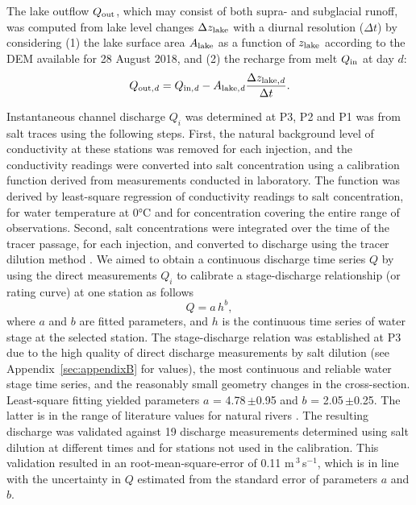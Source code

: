 The lake outflow $Q_{\rm out}$, which may consist of both supra- and subglacial runoff, was computed from lake level changes $\Delta z_{\rm lake }$ with a diurnal resolution ($\Delta t$) by considering (1) the lake surface area $A_{\rm lake}$ as a function of $z_{\rm lake }$ according to the DEM available for 28 August 2018, and (2) the recharge from melt $Q_{\rm in}$ at day $d$:
%
\begin{equation}
  \label{eq:discharge_lake}
Q_{\rm out,\it d} = Q_{\rm in, \it d} -A_{\rm lake,\it d}\frac{\Delta z_{\rm lake,\it d}}{\Delta t}.
\end{equation}

Instantaneous channel discharge ${Q}_i$ was determined at P3, P2 and P1 was from salt traces using the following steps. First, the natural background level of conductivity at these stations was removed for each injection, and the conductivity readings were converted into salt concentration using a calibration function derived from measurements conducted in laboratory. The function was derived by least-square regression of conductivity readings to salt concentration, for water temperature at 0°C and for concentration covering the entire range of observations. Second, salt concentrations were integrated over the time of the tracer passage, for each injection, and converted to discharge using the tracer dilution method \citep[e.g.][]{Hubbard&Glasser2005}.
We aimed to obtain a continuous discharge time series $Q$ by using the direct measurements ${Q}_i$ to calibrate a stage-discharge relationship (or rating curve) at one station as follows
%
\begin{equation}\label{eq:stage/discharge}
Q = a \, h^b,
\end{equation}
%
where $a$ and $b$ are fitted parameters, and $h$ is the continuous time series of water stage at the selected station.  The stage-discharge relation was established at P3 due to the high quality of direct discharge measurements by salt dilution (see Appendix~\ref{sec:appendixB} for values), the most continuous and reliable water stage time series, and the reasonably small geometry changes in the cross-section. Least-square fitting yielded parameters $a$ = 4.78\,$\pm$0.95 and $b$ = 2.05\,$\pm$0.25. The latter is in the range of literature values for natural rivers \citep{Aydin&al2002, Aydin&al2006}. The resulting discharge was validated against 19 discharge measurements determined using salt dilution at different times and for stations not used in the calibration. This validation resulted in an root-mean-square-error of 0.11 m\,$^3$\,s$^{-1}$, which is in line with the uncertainty in $Q$ estimated from the standard error of parameters $a$ and $b$.

